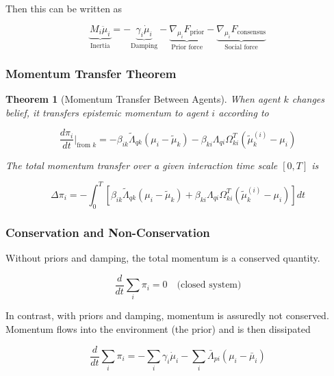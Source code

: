 \documentclass[12pt]{article}
\newtheorem{theorem}{Theorem}
\begin{document}
Then this can be written as

\begin{equation}
\boxed{\underbrace{M_i\ddot{\mu}_i}_{\text{Inertia}} = -\underbrace{\gamma_i\dot{\mu}_i}_{\text{Damping}} - \underbrace{\nabla_{\mu_i}F_{\text{prior}}}_{\text{Prior force}} - \underbrace{\nabla_{\mu_i}F_{\text{consensus}}}_{\text{Social force}}}
\end{equation}

\subsubsection{Momentum Transfer Theorem}

\begin{theorem}[Momentum Transfer Between Agents]

When agent $k$ changes belief, it transfers epistemic momentum to agent $i$ according to

\begin{equation}
\frac{d\pi_i}{dt}\bigg|_{\text{from } k} = -\beta_{ik}\tilde{\Lambda}_{qk}(\mu_i - \tilde{\mu}_k) - \beta_{ki}\Lambda_{qi}\Omega_{ki}^T(\tilde{\mu}_k^{(i)} - \mu_i)
\end{equation}

The total momentum transfer over a given interaction time scale $[0, T]$ is

\begin{equation}
\boxed{\Delta\pi_i = -\int_0^T \left[\beta_{ik}\tilde{\Lambda}_{qk}(\mu_i - \tilde{\mu}_k) + \beta_{ki}\Lambda_{qi}\Omega_{ki}^T(\tilde{\mu}_k^{(i)} - \mu_i)\right] dt}
\end{equation}
\end{theorem}

\subsubsection{Conservation and Non-Conservation}

Without priors and damping, the total momentum is a conserved quantity.

\begin{equation}
\frac{d}{dt}\sum_i \pi_i = 0 \quad \text{(closed system)}
\end{equation}

In contrast,  with priors and damping, momentum is assuredly not conserved. Momentum flows into the environment (the prior) and is then dissipated

\begin{equation}
\frac{d}{dt}\sum_i \pi_i = -\sum_i\gamma_i\dot{\mu}_i - \sum_i\bar{\Lambda}_{pi}(\mu_i - \bar{\mu}_i)
\end{equation}
\end{document}
